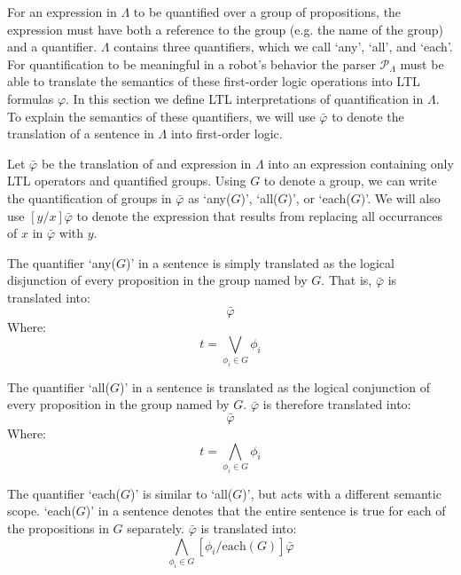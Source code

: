 For an expression in $\Lambda$ to be quantified over a group of propositions, the expression must have both a reference to the group (e.g. the name of the group) and a quantifier. 
$\Lambda$ contains three quantifiers, which we call `any', `all', and `each'. 
For quantification to be meaningful in a robot's behavior the parser $\mathcal{P}_{\Lambda}$ must be able to translate the semantics of these first-order logic operations into LTL formulas $\varphi$.
In this section we define LTL interpretations of quantification in $\Lambda$.  
To explain the semantics of these quantifiers, we will use $\bar{\varphi}$ to denote the translation of a sentence in $\Lambda$ into first-order logic. 
\par Let $\bar{\varphi}$ be the translation of and expression in $\Lambda$ into an expression containing only LTL operators and quantified groups. 
Using $G$ to denote a group, we can write the quantification of groups in $\bar{\varphi}$ as `any($G$)', `all($G$)', or `each($G$)'. 
We will also use $[y/x]\bar{\varphi}$ to denote the expression that results from replacing all occurrances of $x$ in $\bar{\varphi}$ with $y$. 
\par
The quantifier `any($G$)' in a sentence is simply translated as the logical disjunction of every proposition in the group named by $G$. 
That is, $\bar{\varphi}$ is translated into: 
\begin{equation*}
	[ t / \text{any}(G)] \bar{\varphi}
\end{equation*}
Where: 
\begin{equation*}
	t = \bigvee \limits_{\phi_i \in G} \phi_i
\end{equation*}
\par
The quantifier `all($G$)' in a sentence is translated as the logical conjunction of every proposition in the group named by $G$. 
$\bar{\varphi}$ is therefore translated into: 
\begin{equation*}
	[ t / \text{all}(G)] \bar{\varphi}
\end{equation*}
Where:
\begin{equation*}
	t = \bigwedge \limits_{\phi_i \in G} \phi_i
\end{equation*}
\par
The quantifier `each($G$)' is similar to `all($G$)', but acts with a different semantic scope. 
`each($G$)' in a sentence denotes that the entire sentence is true for each of the propositions in $G$ separately. 
$\bar{\varphi}$ is translated into:
\begin{equation*}
 	\bigwedge\limits_{\phi_i \in G} [\phi_i / \text{each}(G)] \bar{\varphi}
\end{equation*}
